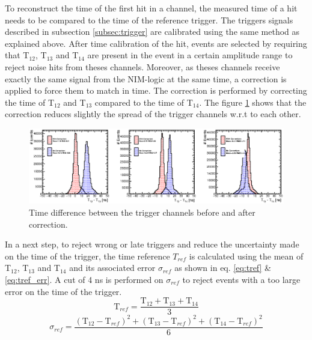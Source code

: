 \documentclass[twoside,a4paper,11pt]{article}
\begin{document}
To reconstruct the time of the first hit in a channel, the measured time of a hit needs to be compared to the time of the reference trigger. The triggers signals described in subsection \ref{subsec:trigger} are calibrated using the same method as explained above. After time calibration of the hit, events are selected by requiring that T$_{12}$, T$_{13}$ and T$_{14}$ are present in the event in a certain amplitude range to reject noise hits from theses channels. Moreover, as theses channels receive exactly the same signal from the NIM-logic at the same time, a correction is applied to force them to match in time. The correction is performed by correcting the time of T$_{12}$ and T$_{13}$ compared to the time of T$_{14}$. The figure \ref{fig:T0_Correction} shows that the correction reduces slightly the spread of the trigger channels w.r.t to each other.
\begin{figure}[htbp]
\begin{center}
\includegraphics[width=1.0\textwidth]{fig/T0s_Resolution_2.eps}
\caption{Time difference between the trigger channels before and after correction.}
\label{fig:T0_Correction}
\end{center}
\end{figure}
In a next step, to reject wrong or late triggers and reduce the uncertainty made on the time of the trigger, the time reference $T_{ref}$ is calculated using the mean of T$_{12}$, T$_{13}$ and T$_{14}$ and its associated error $\sigma_{ref}$ as shown in eq. \ref{eq:tref} \& \ref{eq:tref_err}. A cut of 4 ns is performed on $\sigma_{ref}$ to reject events with a too large error on the time of the trigger.
\begin{equation} \label{eq:tref}
\text{T}_{ref} = \frac{\text{T}_{12} + \text{T}_{13} + \text{T}_{14}}{3}
\end{equation}
\begin{equation} \label{eq:tref_err}
\sigma_{ref} = \frac{ (\text{T}_{12} - \text{T}_{ref})^2 + (\text{T}_{13} - \text{T}_{ref})^2  + (\text{T}_{14} - \text{T}_{ref})^2 }{6}
\end{equation}
\end{document}
